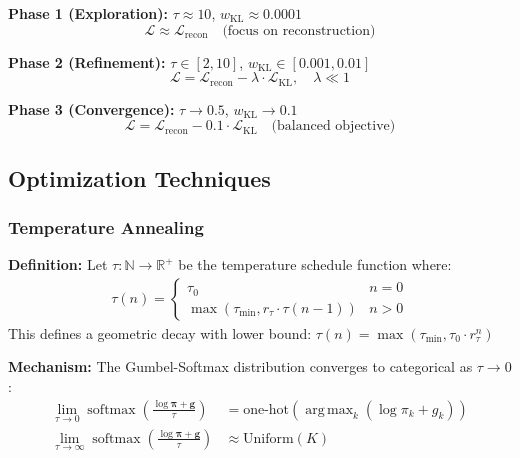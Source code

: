 \documentclass[11pt]{article}
\DeclareMathOperator*{\argmax}{arg\,max}
\DeclareMathOperator{\softmax}{softmax}
\begin{document}
\textbf{Phase 1 (Exploration):} $\tau \approx 10$, $w_{\text{KL}} \approx 0.0001$
\begin{equation}
\mathcal{L} \approx \mathcal{L}_{\text{recon}} \quad \text{(focus on reconstruction)}
\end{equation}

\textbf{Phase 2 (Refinement):} $\tau \in [2, 10]$, $w_{\text{KL}} \in [0.001, 0.01]$
\begin{equation}
\mathcal{L} = \mathcal{L}_{\text{recon}} - \lambda \cdot \mathcal{L}_{\text{KL}}, \quad \lambda \ll 1
\end{equation}

\textbf{Phase 3 (Convergence):} $\tau \to 0.5$, $w_{\text{KL}} \to 0.1$
\begin{equation}
\mathcal{L} = \mathcal{L}_{\text{recon}} - 0.1 \cdot \mathcal{L}_{\text{KL}} \quad \text{(balanced objective)}
\end{equation}



\subsection{Optimization Techniques}

\subsubsection{Temperature Annealing}

\textbf{Definition:}
Let $\tau: \mathbb{N} \to \mathbb{R}^+$ be the temperature schedule function where:
\begin{align}
\tau(n) = \begin{cases}
\tau_0 & n = 0 \\
\max(\tau_{\min}, r_\tau \cdot \tau(n-1)) & n > 0
\end{cases}
\end{align}
This defines a geometric decay with lower bound: $\tau(n) = \max(\tau_{\min}, \tau_0 \cdot r_\tau^n)$

\textbf{Mechanism:}
The Gumbel-Softmax distribution converges to categorical as $\tau \to 0$:
\begin{align}
\lim_{\tau \to 0} \softmax\left(\frac{\log \bm{\pi} + \mathbf{g}}{\tau}\right) &= \text{one-hot}(\argmax_k(\log \pi_k + g_k)) \\
\lim_{\tau \to \infty} \softmax\left(\frac{\log \bm{\pi} + \mathbf{g}}{\tau}\right) &\approx \text{Uniform}(K)
\end{align}
\end{document}
